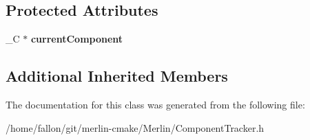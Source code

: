 \subsection*{Protected Attributes}
\begin{DoxyCompactItemize}
\item 
\mbox{\label{classTBunchCMPTracker_1_1Integrator_a16557a3e9968e88a714d349cd2481778}} 
\+\_\+C $\ast$ {\bfseries current\+Component}
\end{DoxyCompactItemize}
\subsection*{Additional Inherited Members}


The documentation for this class was generated from the following file\+:\begin{DoxyCompactItemize}
\item 
/home/fallon/git/merlin-\/cmake/\+Merlin/Component\+Tracker.\+h\end{DoxyCompactItemize}
